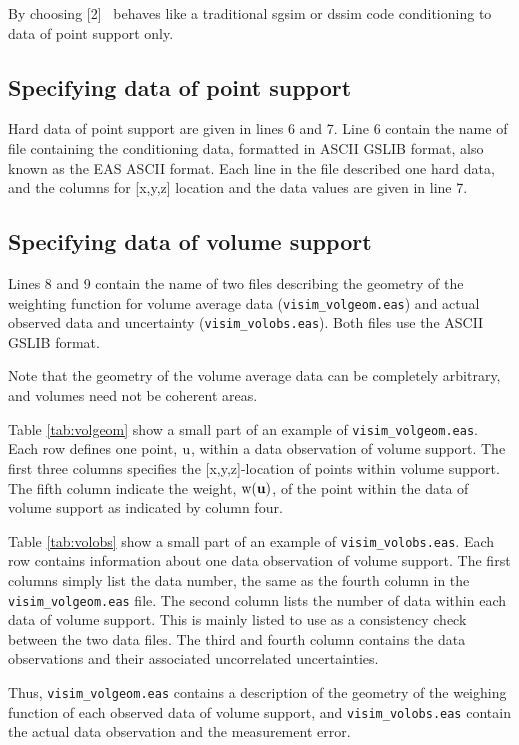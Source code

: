 \documentclass[12t]{article}
\begin{document}
By choosing [2] \visimprog~behaves like a traditional sgsim or dssim
code conditioning to data of point support only.

\subsection{Specifying data of point support}
Hard data of point support are given in lines 6 and 7. Line 6 contain
the name of file containing the conditioning data, formatted in ASCII
GSLIB format, also known as the EAS ASCII format. Each line in the
file described one hard data, and the columns for [x,y,z] location and the data
values are given in line 7.

\subsection{Specifying data of volume support}
Lines 8 and 9 contain the name of two files describing the geometry of
the weighting function for volume average data (\texttt{visim\_volgeom.eas}) and actual
observed data and uncertainty (\texttt{visim\_volobs.eas}). Both files
use the ASCII GSLIB format.

Note that the geometry of the volume average data can be completely
arbitrary, and volumes need not be coherent areas.

Table \ref{tab:volgeom} show a small part of an example of \texttt{visim\_volgeom.eas}. Each row defines one point, ${\rm u}$, within a data observation of volume support.
The first three columns specifies the [x,y,z]-location of points within volume support. 
 The fifth column indicate the weight, ${\rm w}({\bf u})$, of the point within the data of volume support as indicated by column four. 

Table \ref{tab:volobs} show a small part of an example of
\texttt{visim\_volobs.eas}. Each row contains information about one
data observation of volume support. The first columns simply list the
data number, the same as the fourth column in the
\texttt{visim\_volgeom.eas} file. The second column lists the number
of data within each data of volume support. This is mainly listed to
use as a consistency check between the two data files. The third and
fourth column contains the data observations and their associated uncorrelated uncertainties.

Thus,  \texttt{visim\_volgeom.eas} contains a description of the geometry of the weighing function of each observed data of volume support, and  \texttt{visim\_volobs.eas} contain the actual data observation and the measurement error.
\end{document}
